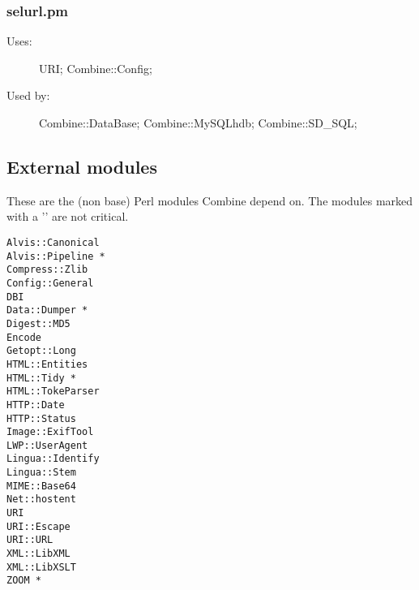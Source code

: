 \subsubsection{selurl.pm}
\begin{description}
\item[Uses:] URI; Combine::Config; 

\item[Used by:] Combine::DataBase; Combine::MySQLhdb; Combine::SD\_SQL; 

\end{description}
\subsection{External modules}
\label{extmods}
These are the (non base) Perl modules Combine depend on.
The modules marked with a '{\tt *}' are not critical.
\begin{verbatim}
Alvis::Canonical
Alvis::Pipeline *
Compress::Zlib
Config::General
DBI
Data::Dumper *
Digest::MD5
Encode
Getopt::Long
HTML::Entities
HTML::Tidy *
HTML::TokeParser
HTTP::Date
HTTP::Status
Image::ExifTool
LWP::UserAgent
Lingua::Identify
Lingua::Stem
MIME::Base64
Net::hostent
URI
URI::Escape
URI::URL
XML::LibXML
XML::LibXSLT
ZOOM *
\end{verbatim}
